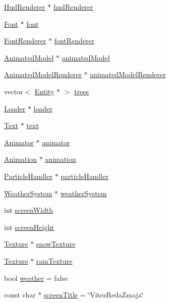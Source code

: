 \begin{DoxyCompactItemize}
\item 
\hyperlink{classhud_1_1HudRenderer}{Hud\+Renderer} $\ast$ \hyperlink{namespacecore_aee35d512367a35873a31455fd218d84a}{hud\+Renderer}
\item 
\hyperlink{classfont_1_1Font}{Font} $\ast$ \hyperlink{namespacecore_a9c0aadaade788b336cfbba4db9c87a8e}{font}
\item 
\hyperlink{classfont_1_1FontRenderer}{Font\+Renderer} $\ast$ \hyperlink{namespacecore_ac8af6c1a584af6d86930b36660a73486}{font\+Renderer}
\item 
\hyperlink{classmodel_1_1AnimatedModel}{Animated\+Model} $\ast$ \hyperlink{namespacecore_a32acc9ced9824face25fb6376f19427c}{animated\+Model}
\item 
\hyperlink{classcore_1_1AnimatedModelRenderer}{Animated\+Model\+Renderer} $\ast$ \hyperlink{namespacecore_a8788476f2673b1425b8946203866084c}{animated\+Model\+Renderer}
\item 
vector$<$ \hyperlink{classentity_1_1Entity}{Entity} $\ast$ $>$ \hyperlink{namespacecore_a7f37c29928536493e41e65032818b8f3}{trees}
\item 
\hyperlink{classcore_1_1Loader}{Loader} $\ast$ \hyperlink{namespacecore_afa1e7446007b3eaf393f3d47487a1782}{loader}
\item 
\hyperlink{classfont_1_1Text}{Text} $\ast$ \hyperlink{namespacecore_a7f65917b3299aa904f0516343ec522db}{text}
\item 
\hyperlink{classanimation_1_1Animator}{Animator} $\ast$ \hyperlink{namespacecore_af734c64894d0dfcd75e6c6c8ca62d29b}{animator}
\item 
\hyperlink{classanimation_1_1Animation}{Animation} $\ast$ \hyperlink{namespacecore_acb97154ea6e035e44613e11f6df6a50b}{animation}
\item 
\hyperlink{classparticle_1_1ParticleHandler}{Particle\+Handler} $\ast$ \hyperlink{namespacecore_ad86ad607ae7f1f4cd7f425753e39fb5d}{particle\+Handler}
\item 
\hyperlink{classparticle_1_1WeatherSystem}{Weather\+System} $\ast$ \hyperlink{namespacecore_a985cbb636cfce09e29c1e0cc52b1fbde}{weather\+System}
\item 
int \hyperlink{namespacecore_a1b1f1651effee4b2dba419d8381a9d60}{screen\+Width}
\item 
int \hyperlink{namespacecore_a985c45c5bff737ef922df5a06c814756}{screen\+Height}
\item 
\hyperlink{classtexture_1_1Texture}{Texture} $\ast$ \hyperlink{namespacecore_aa7075d07c89f570f428557cfaaefc16b}{snow\+Texture}
\item 
\hyperlink{classtexture_1_1Texture}{Texture} $\ast$ \hyperlink{namespacecore_aac1dbd86236077861e658da24c0963ff}{rain\+Texture}
\item 
bool \hyperlink{namespacecore_a6a9140ce7a80c31c7ac37e2567ab60fa}{weather} = false
\item 
const char $\ast$ \hyperlink{namespacecore_ab274ea2c748b3da9a978f504eab4ee85}{screen\+Title} = \char`\"{}Vitez\+Reda\+Zmaja\char`\"{}
\end{DoxyCompactItemize}


